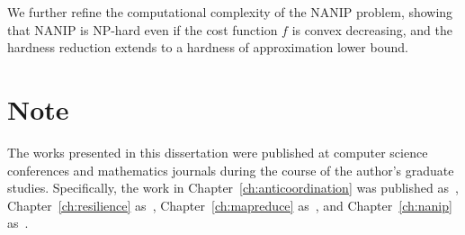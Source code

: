 We further refine the computational complexity of the NANIP problem, showing
that NANIP is NP-hard even if the cost function $f$ is convex decreasing, and
the hardness reduction extends to a hardness of approximation lower bound.

\section{Note}

The works presented in this dissertation were published at computer science
conferences and mathematics journals during the course of the author's graduate
studies. Specifically, the work in Chapter~\ref{ch:anticoordination} was
published as~\cite{KunPR13}, Chapter~\ref{ch:resilience} as~\cite{KunR14},
Chapter~\ref{ch:mapreduce} as~\cite{FishKLRT15}, and Chapter~\ref{ch:nanip}
as~\cite{GutfraindKLR15}.
